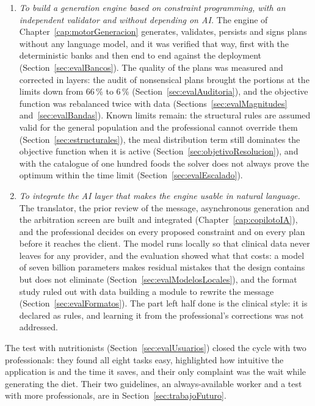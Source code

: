 \begin{enumerate}
    \item \textit{To build a generation engine based on constraint programming, with an independent validator and without depending on AI.} The engine of Chapter~\ref{cap:motorGeneracion} generates, validates, persists and signs plans without any language model, and it was verified that way, first with the deterministic banks and then end to end against the deployment (Section~\ref{sec:evalBancos}). The quality of the plans was measured and corrected in layers: the audit of nonsensical plans brought the portions at the limits down from 66\,\% to 6\,\% (Section~\ref{sec:evalAuditoria}), and the objective function was rebalanced twice with data (Sections~\ref{sec:evalMagnitudes} and~\ref{sec:evalBandas}). Known limits remain: the structural rules are assumed valid for the general population and the professional cannot override them (Section~\ref{sec:estructurales}), the meal distribution term still dominates the objective function when it is active (Section~\ref{sec:objetivoResolucion}), and with the catalogue of one hundred foods the solver does not always prove the optimum within the time limit (Section~\ref{sec:evalEscalado}).

    \item \textit{To integrate the AI layer that makes the engine usable in natural language.} The translator, the prior review of the message, asynchronous generation and the arbitration screen are built and integrated (Chapter~\ref{cap:copilotoIA}), and the professional decides on every proposed constraint and on every plan before it reaches the client. The model runs locally so that clinical data never leaves for any provider, and the evaluation showed what that costs: a model of seven billion parameters makes residual mistakes that the design contains but does not eliminate (Section~\ref{sec:evalModelosLocales}), and the format study ruled out with data building a module to rewrite the message (Section~\ref{sec:evalFormatos}). The part left half done is the clinical style: it is declared as rules, and learning it from the professional's corrections was not addressed.
\end{enumerate}

The test with nutritionists (Section~\ref{sec:evalUsuarios}) closed the cycle with two professionals: they found all eight tasks easy, highlighted how intuitive the application is and the time it saves, and their only complaint was the wait while generating the diet. Their two guidelines, an always-available worker and a test with more professionals, are in Section~\ref{sec:trabajoFuturo}.


